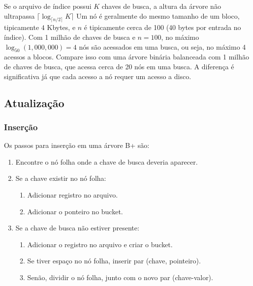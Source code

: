 Se o arquivo de índice possui $K$ chaves de busca, a altura da árvore não
ultrapassa $\lceil \log_{\lceil n/2 \rceil} K \rceil$
Um nó é geralmente do mesmo tamanho de um bloco, tipicamente $4$ Kbytes, e 
$n$ é tipicamente cerca de 100 (40 bytes por entrada no índice).
Com 1 milhão de chaves de busca e $n= 100$, no máximo $\log_{50}(1,000,000) = 4$
nós são acessados em uma busca, ou seja, no máximo 4 acessos a blocos.
Compare isso com uma árvore binária balanceada com 1 milhão de chaves de busca,
que acessa cerca de 20 nós em uma busca.
A diferença é significativa já que cada acesso a nó requer um acesso a disco.

\subsection{Atualização}

\subsubsection{Inserção}

Os passos para inserção em uma árvore B+ são:
\begin{enumerate}
\item Encontre o nó folha onde a chave de busca deveria aparecer.
\item Se a chave existir no nó folha:
	\begin{enumerate}
	\item Adicionar registro no arquivo.
	\item Adicionar o ponteiro no bucket.
	\end{enumerate}
\item Se a chave de busca não estiver presente:
	\begin{enumerate}
	\item Adicionar o registro no arquivo e criar o bucket.
	\item Se tiver espaço no nó folha, inserir par (chave, pointeiro).
	\item Senão, dividir o nó folha, junto com o novo par (chave-valor).
	\end{enumerate}
\end{enumerate}

